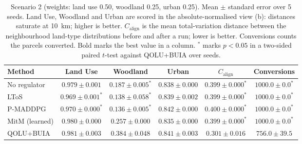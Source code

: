 \begin{table}[htbp]
  \centering
  \caption{Scenario 2 (weights: land use 0.50, woodland 0.25, urban 0.25). Mean $\pm$ standard error over 5 seeds. Land Use, Woodland and Urban are scored in the absolute-normalised view (b): distances saturate at 10~km; higher is better. $C_{\text{align}}$ is the mean total-variation distance between the neighbourhood land-type distributions before and after a run; lower is better. Conversions counts the parcels converted. Bold marks the best value in a column. $^{*}$ marks $p < 0.05$ in a two-sided paired $t$-test against QOLU+BUIA over seeds.}
  \label{tab:p2-results-s2}
  \begin{tabular}{lccccc}
    \toprule
    Method & Land Use & Woodland & Urban & $C_{\text{align}}$ & Conversions \\
    \midrule
    No regulator & $0.979 \pm 0.001$ & $0.187 \pm 0.005^{*}$ & $0.838 \pm 0.000$ & $0.399 \pm 0.000^{*}$ & $1000.0 \pm 0.0^{*}$ \\
    LToS & $0.969 \pm 0.001^{*}$ & $0.138 \pm 0.058^{*}$ & $0.839 \pm 0.002$ & $0.399 \pm 0.000^{*}$ & $1000.0 \pm 0.0^{*}$ \\
    P-MADDPG & $0.970 \pm 0.000^{*}$ & $0.136 \pm 0.005^{*}$ & $\mathbf{0.842 \pm 0.000}$ & $0.400 \pm 0.000^{*}$ & $1000.0 \pm 0.0^{*}$ \\
    MitM (learned) & $0.980 \pm 0.000$ & $0.257 \pm 0.000$ & $0.835 \pm 0.000$ & $0.399 \pm 0.000^{*}$ & $1000.0 \pm 0.0^{*}$ \\
    QOLU+BUIA & $\mathbf{0.981 \pm 0.003}$ & $\mathbf{0.384 \pm 0.048}$ & $0.841 \pm 0.003$ & $\mathbf{0.301 \pm 0.016}$ & $756.0 \pm 39.5$ \\
    \bottomrule
  \end{tabular}
\end{table}
